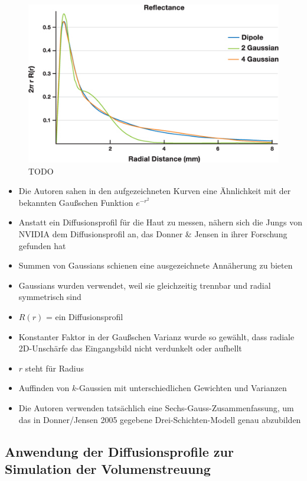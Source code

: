 \documentclass[ngerman,runningheads,a4paper]{llncs}[2018/03/10]
\begin{document}
\begin{figure}
\includegraphics[scale=0.8,keepaspectratio]{./images/approximation-gaussians}
\caption{TODO}
\end{figure}

\begin{itemize}
  \item Die Autoren sahen in den aufgezeichneten Kurven eine Ähnlichkeit mit der bekannten Gaußschen Funktion $e^{-r^2}$
  \item Anstatt ein Diffusionsprofil für die Haut zu messen, nähern sich die Jungs von NVIDIA dem Diffusionsprofil an, das Donner \& Jensen in ihrer Forschung gefunden hat
  \item Summen von Gaussians schienen eine ausgezeichnete Annäherung zu bieten
  \item Gaussians wurden verwendet, weil sie gleichzeitig trennbar und radial symmetrisch sind
  \item $R(r)$ = ein Diffusionsprofil
  \item Konstanter Faktor in der Gaußschen Varianz wurde so gewählt, dass radiale 2D-Unschärfe das Eingangsbild nicht verdunkelt oder aufhellt
  \item $r$ steht für Radius
  \item Auffinden von $k$-Gaussien mit unterschiedlichen Gewichten und Varianzen
  \item Die Autoren verwenden tatsächlich eine Sechs-Gauss-Zusammenfassung, um das in Donner/Jensen 2005 gegebene Drei-Schichten-Modell genau abzubilden
\end{itemize}

\subsection{Anwendung der Diffusionsprofile zur Simulation der Volumenstreuung}
\end{document}
